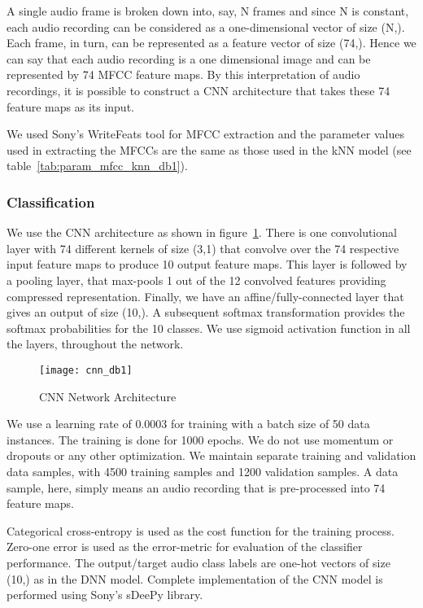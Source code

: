 A single audio frame is broken down into, say, N frames and since N is constant, each audio recording can be considered as a one-dimensional vector of size (N,). Each frame, in turn, can be represented as a feature vector of size (74,). Hence we can say that each audio recording is a one dimensional image and can be represented by 74 MFCC feature maps. By this interpretation of audio recordings, it is possible to construct a CNN architecture that takes these 74 feature maps as its input. 

We used Sony's WriteFeats tool for MFCC extraction and the parameter values used in extracting the MFCCs are the same as those used in the kNN model (see table~\ref{tab:param_mfcc_knn_db1}).

\subsubsection{Classification}
We use the CNN architecture as shown in figure~\ref{fig:cnn_db1}. There is one convolutional layer with 74 different kernels of size (3,1) that convolve over the 74 respective input feature maps to produce 10 output feature maps. This layer is followed by a pooling layer, that max-pools 1 out of the 12 convolved features providing compressed representation. Finally, we have an affine/fully-connected layer that gives an output of size (10,). A subsequent softmax transformation provides the softmax probabilities for the 10 classes. We use sigmoid activation function in all the layers, throughout the network. 

\begin{figure}[!htb] 
\centering 
\texttt{[image: cnn\_db1]}
\caption[CNN Network Architecture]{CNN Network Architecture}
\label{fig:cnn_db1} 
\end{figure}

We use a learning rate of 0.0003 for training with a batch size of 50 data instances. The training is done for 1000 epochs. We do not use momentum or dropouts or any other optimization. We maintain separate training and validation data samples, with 4500 training samples and 1200 validation samples. A data sample, here, simply means an audio recording that is pre-processed into 74 feature maps.

Categorical cross-entropy is used as the cost function for the training process. Zero-one error is used as the error-metric for evaluation of the classifier performance. The output/target audio class labels are one-hot vectors of size (10,) as in the DNN model. Complete implementation of the CNN model is performed using Sony's sDeePy library.


